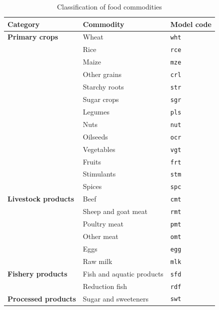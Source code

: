 \begin{center}
\begin{xltabular}{\linewidth}{l l l}
  \caption{Classification of food commodities}\label{tab:commodities}\\
    \toprule
    \textbf{Category} & \textbf{Commodity} & \textbf{Model code} \\
    \midrule
    \textbf{Primary crops} & Wheat & \texttt{wht} \\
                           & Rice & \texttt{rce} \\
                           & Maize & \texttt{mze} \\
                           & Other grains & \texttt{crl} \\
                           & Starchy roots & \texttt{str} \\
                           & Sugar crops & \texttt{sgr} \\
                           & Legumes & \texttt{pls} \\
                           & Nuts & \texttt{nut} \\
                           & Oilseeds & \texttt{ocr} \\
                           & Vegetables & \texttt{vgt} \\
                           & Fruits & \texttt{frt} \\
                           & Stimulants & \texttt{stm} \\
                           & Spices & \texttt{spc} \\
    \addlinespace[4pt]
    \textbf{Livestock products} & Beef & \texttt{cmt} \\
                                & Sheep and goat meat & \texttt{rmt} \\
                                & Poultry meat & \texttt{pmt} \\
                                & Other meat & \texttt{omt} \\
                                & Eggs & \texttt{egg} \\
                                & Raw milk & \texttt{mlk} \\
    \addlinespace[4pt]
    \textbf{Fishery products} & Fish and aquatic products & \texttt{sfd} \\
                               & Reduction fish & \texttt{rdf} \\
    \addlinespace[4pt]
    \textbf{Processed products} & Sugar and sweeteners & \texttt{swt} \\

\end{xltabular}
\end{center}
